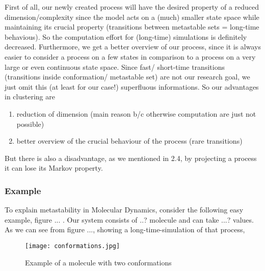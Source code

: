 First of all, our newly created process will have the desired property of a reduced dimension/complexity since the model acts on a (much) smaller state space while maintaining its crucial property (transitions between metastable sets = long-time behavious). So the computation effort for (long-time) simulations is definitely decreased.
Furthermore, we get a better overview of our process, since it is always easier to consider a process on a few states in comparison to a process on a very large or even continuous state space. Since fast/ short-time transitions (transitions inside conformation/ metastable set) are not our research goal, we just omit this (at least for our case!) superfluous informations.
So our advantages in clustering are
\begin{enumerate}
\item reduction of dimension (main reason b/c otherwise computation are just not possible)
\item better overview of the crucial behaviour of the process (rare transitions)
\end{enumerate}
But there is also a disadvantage, as we mentioned in 2.4, by projecting a process it can lose its Markov property.  

\subsubsection*{Example}

To explain metastability in Molecular Dynamics, consider the following easy example, figure ... .
Our system consists of ..? molecule and can take ...? values.
As we can see from figure ..., showing a long-time-simulation of that process,

\begin{figure}
	\centering
	\texttt{[image: conformations.jpg]} %
	\caption{Example of a molecule with two conformations}
\end{figure}
